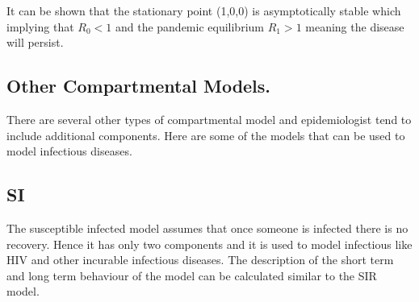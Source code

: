 It can be shown that the stationary point (1,0,0) is asymptotically stable which implying that $R_0 <1$ and the pandemic  equilibrium $R_1 >1$ meaning the disease will persist.

\subsection{Other Compartmental Models.}

There are several other types of compartmental model and epidemiologist tend to include additional components. Here are some of the models that can be used to model infectious diseases.

\subsection{SI} The susceptible infected model assumes that once someone is infected there is no recovery. Hence it has only two components and it is used to model infectious like HIV and other incurable infectious diseases. The description of the short term and long term behaviour of the model can be calculated similar to the SIR model.
 

